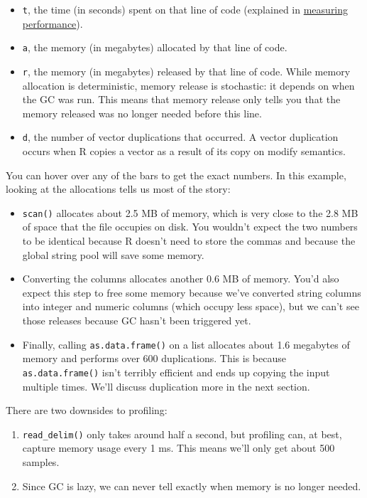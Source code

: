 \begin{itemize}
\item
  \texttt{t}, the time (in seconds) spent on that line of code
  (explained in \hyperref[measure-perf]{measuring performance}).
\item
  \texttt{a}, the memory (in megabytes) allocated by that line of code.
\item
  \texttt{r}, the memory (in megabytes) released by that line of code.
  While memory allocation is deterministic, memory release is
  stochastic: it depends on when the GC was run. This means that memory
  release only tells you that the memory released was no longer needed
  before this line.
\item
  \texttt{d}, the number of vector duplications that occurred. A vector
  duplication occurs when R copies a vector as a result of its copy on
  modify semantics.
\end{itemize}

You can hover over any of the bars to get the exact numbers. In this
example, looking at the allocations tells us most of the story:

\begin{itemize}
\item
  \texttt{scan()} allocates about 2.5 MB of memory, which is very close
  to the 2.8 MB of space that the file occupies on disk. You wouldn't
  expect the two numbers to be identical because R doesn't need to store
  the commas and because the global string pool will save some memory.
\item
  Converting the columns allocates another 0.6 MB of memory. You'd also
  expect this step to free some memory because we've converted string
  columns into integer and numeric columns (which occupy less space),
  but we can't see those releases because GC hasn't been triggered yet.
\item
  Finally, calling \texttt{as.data.frame()} on a list allocates about
  1.6 megabytes of memory and performs over 600 duplications. This is
  because \texttt{as.data.frame()} isn't terribly efficient and ends up
  copying the input multiple times. We'll discuss duplication more in
  the next section.
\end{itemize}

There are two downsides to profiling:

\begin{enumerate}
\def\labelenumi{\arabic{enumi}.}
\item
  \texttt{read\_delim()} only takes around half a second, but profiling
  can, at best, capture memory usage every 1 ms. This means we'll only
  get about 500 samples.
\item
  Since GC is lazy, we can never tell exactly when memory is no longer
  needed.
\end{enumerate}

